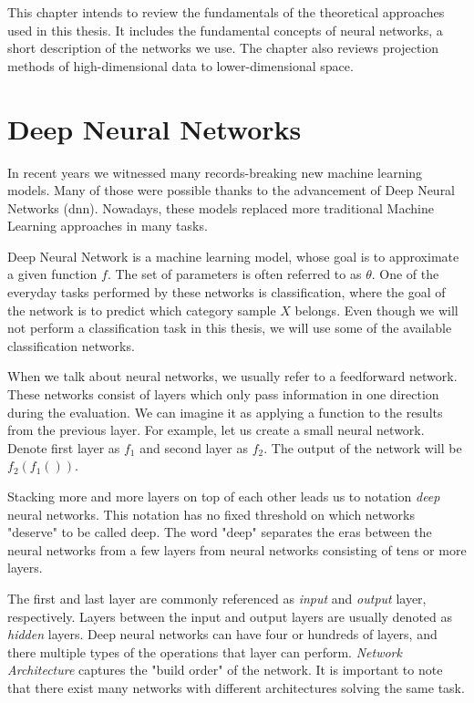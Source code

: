 This chapter intends to review the fundamentals of the theoretical approaches used in this thesis. It includes the fundamental concepts of neural networks, a short description of the networks we use. The chapter also reviews projection methods of high-dimensional data to lower-dimensional space.

\section{Deep Neural Networks}

In recent years we witnessed many records-breaking new machine learning models. Many of those were possible thanks to the advancement of Deep Neural Networks (\acrshort{dnn}). Nowadays, these models replaced more traditional Machine Learning approaches in many tasks.

Deep Neural Network is a machine learning model, whose goal is to approximate a given function \(f\). The set of parameters is often referred to as \(\theta\). One of the everyday tasks performed by these networks is classification, where the goal of the network is to predict which category sample \(X\) belongs. Even though we will not perform a classification task in this thesis, we will use some of the available classification networks.

When we talk about neural networks, we usually refer to a feedforward network. These networks consist of layers which only pass information in one direction during the evaluation. We can imagine it as applying a function to the results from the previous layer. For example, let us create a small neural network. Denote first layer as \(f_1\) and second layer as \(f_2\). The output of the network will be \(f_2\left(f_1\left(\right)\right)\).

Stacking more and more layers on top of each other leads us to notation \emph{deep} neural networks. This notation has no fixed threshold on which networks "deserve" to be called deep. The word "deep" separates the eras between the neural networks from a few layers from neural networks consisting of tens or more layers.  

The first and last layer are commonly referenced as \emph{input} and \emph{output} layer, respectively. Layers between the input and output layers are usually denoted as \emph{hidden} layers. Deep neural networks can have four or hundreds of layers, and there multiple types of the operations that layer can perform. \emph{Network Architecture} captures the "build order" of the network. It is important to note that there exist many networks with different architectures solving the same task.


